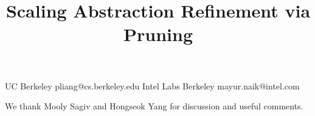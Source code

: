 \documentclass[nocopyrightspace,9pt]{sigplanconf}
\begin{document}
\copyrightdata{[to be supplied]} 


\title{Scaling Abstraction Refinement via Pruning}

           {UC  Berkeley}
           {pliang@cs.berkeley.edu}
           {Intel Labs Berkeley}
           {mayur.naik@intel.com}




\maketitle














\acks
We thank Mooly Sagiv and Hongseok Yang for discussion and useful comments.





\end{document}
